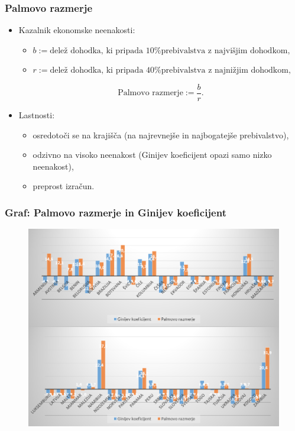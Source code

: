 \documentclass[10pt]{beamer}
\begin{document}
\begin{frame}
\frametitle{Palmovo razmerje}
\begin{itemize}
\item Kazalnik ekonomske neenakosti:

\begin{itemize}
\item $b := \textrm{delež dohodka, ki pripada 10\% prebivalstva z najvišjim dohodkom},$
\item $r := \textrm{delež dohodka, ki pripada 40\% prebivalstva z najnižjim dohodkom},$
\end{itemize}
$$
\textrm{Palmovo razmerje} := \frac{b}{r}.
$$

\item Lastnosti:
\begin{itemize}
\item osredotoči se na krajišča (na najrevnejše in najbogatejše prebivalstvo),
\item odzivno na visoko neenakost (Ginijev koeficijent opazi samo nizko neenakost),
\item preprost izračun.
\end{itemize}
\end{itemize}
\end{frame}

\begin{frame}
\frametitle{Graf: Palmovo razmerje in Ginijev koeficijent}
\begin{figure}
\includegraphics[scale = 0.87]{./slike/gini_palma.png}
\end{figure}

\end{frame}
\end{document}
